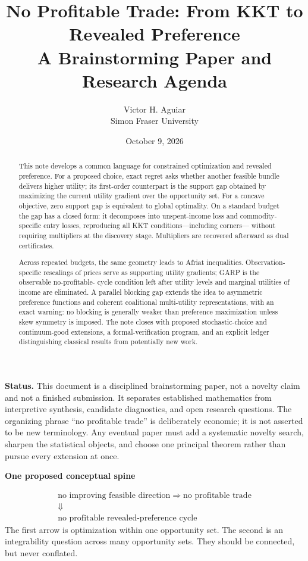 \documentclass[11pt]{article}
\title{\vspace{-0.6in}\textbf{No Profitable Trade: From KKT to Revealed Preference}\\[0.35em]
  \large A Brainstorming Paper and Research Agenda}
\author{Victor H. Aguiar\\Simon Fraser University}
\date{October 9, 2026}
\theoremstyle{definition}
\theoremstyle{remark}
\begin{document}
\maketitle

\begin{statusbox}
\textbf{Status.} This document is a disciplined brainstorming paper, not a novelty claim and
not a finished submission.  It separates established mathematics from interpretive synthesis,
candidate diagnostics, and open research questions.  The organizing phrase ``no profitable
trade'' is deliberately economic; it is not asserted to be new terminology.  Any eventual paper
must add a systematic novelty search, sharpen the statistical objects, and choose one principal
theorem rather than pursue every extension at once.
\end{statusbox}

\begin{abstract}
This note develops a common language for constrained optimization and revealed preference.
For a proposed choice, exact regret asks whether another feasible bundle delivers higher utility;
its first-order counterpart is the support gap obtained by maximizing the current utility gradient
over the opportunity set.  For a concave objective, zero support gap is equivalent to global
optimality.  On a standard budget the gap has a closed form: it decomposes into unspent-income
loss and commodity-specific entry losses, reproducing all KKT conditions---including corners---
without requiring multipliers at the discovery stage.  Multipliers are recovered afterward as
dual certificates.

Across repeated budgets, the same geometry leads to Afriat inequalities.  Observation-specific
rescalings of prices serve as supporting utility gradients; GARP is the observable no-profitable-
cycle condition left after utility levels and marginal utilities of income are eliminated.  A
parallel blocking gap extends the idea to asymmetric preference functions and coherent
coalitional multi-utility representations, with an exact warning: no blocking is generally weaker
than preference maximization unless skew symmetry is imposed.  The note closes with proposed
stochastic-choice and continuum-good extensions, a formal-verification program, and an explicit
ledger distinguishing classical results from potentially new work.
\end{abstract}

\begin{keybox}
\centering
\textbf{One proposed conceptual spine}\par
\vspace{3pt}
\[
\boxed{
\begin{gathered}
\text{no improving feasible direction}
\;\Longrightarrow\;
\text{no profitable trade}\\[-1pt]
\Downarrow\\[-1pt]
\text{no profitable revealed-preference cycle}
\end{gathered}
}
\]
The first arrow is optimization within one opportunity set.  The second is an integrability
question across many opportunity sets.  They should be connected, but never conflated.
\end{keybox}
\end{document}
